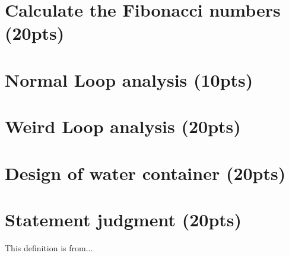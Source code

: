\documentclass{article}[12pt]
\begin{document}
\newpage
\section{Calculate the Fibonacci numbers (20pts)}

\newpage
\section{Normal Loop analysis (10pts)}

\newpage
\section{Weird Loop analysis (20pts)}

\newpage
\section{Design of water container (20pts)}

\newpage
\section{Statement judgment (20pts)}

\newpage
\begin{thebibliography}{99}
 This definition is from...
\end{thebibliography}
\end{document}
